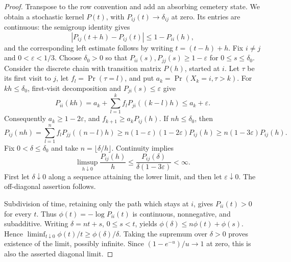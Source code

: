 \documentclass[reqno]{amsart}
\theoremstyle{definition}
\theoremstyle{remark}
\begin{document}
\begin{proof}
Transpose to the row convention and add an absorbing cemetery state.
We obtain a stochastic kernel \(P(t)\), with
\(P_{ij}(t)\to\delta_{ij}\) at zero.  Its entries are continuous: the
semigroup identity gives
\[
 |P_{ij}(t+h)-P_{ij}(t)|\le 1-P_{ii}(h),
\]
and the corresponding left estimate follows by writing \(t=(t-h)+h\).
Fix \(i\ne j\) and \(0<\varepsilon<1/3\).  Choose \(\delta_0>0\) so that
\(P_{ii}(s),P_{jj}(s)\ge1-\varepsilon\) for \(0\le s\le\delta_0\).
Consider the discrete chain with transition matrix \(P(h)\), started at
\(i\).  Let \(\tau\) be its first visit to \(j\), let
\(f_l=\Pr(\tau=l)\), and put
\(a_k=\Pr(X_k=i,\tau>k)\).
For \(kh\le\delta_0\), first-visit decomposition and
\(P_{ji}(s)\le\varepsilon\) give
\[
 P_{ii}(kh)
 =a_k+\sum_{l=1}^k f_lP_{ji}((k-l)h)\le a_k+\varepsilon .
\]
Consequently \(a_k\ge1-2\varepsilon\), and
\(f_{k+1}\ge a_kP_{ij}(h)\).  If \(nh\le\delta_0\), then
\[
 P_{ij}(nh)
 =\sum_{l=1}^n f_lP_{jj}((n-l)h)
 \ge n(1-\varepsilon)(1-2\varepsilon)P_{ij}(h)
 \ge n(1-3\varepsilon)P_{ij}(h).
\]
Fix \(0<\delta\le\delta_0\) and take \(n=\lfloor\delta/h\rfloor\).
Continuity implies
\[
 \limsup_{h\downarrow0}\frac{P_{ij}(h)}h
 \le \frac{P_{ij}(\delta)}{\delta(1-3\varepsilon)}<\infty .
\]
First let \(\delta\downarrow0\) along a sequence attaining the lower limit,
and then let \(\varepsilon\downarrow0\).  The off-diagonal assertion follows.

Subdivision of time, retaining only the path which stays at \(i\), gives
\(P_{ii}(t)>0\) for every \(t\).  Thus
\(\phi(t)=-\log P_{ii}(t)\) is continuous, nonnegative, and subadditive.
Writing \(\delta=nt+s\), \(0\le s<t\), yields
\(\phi(\delta)\le n\phi(t)+\phi(s)\).  Hence
\(\liminf_{t\downarrow0}\phi(t)/t\ge\phi(\delta)/\delta\).
Taking the supremum over \(\delta>0\) proves existence of the limit, possibly
infinite.  Since \((1-e^{-u})/u\to1\) at zero, this is also the asserted
diagonal limit.
\end{proof}
\end{document}
